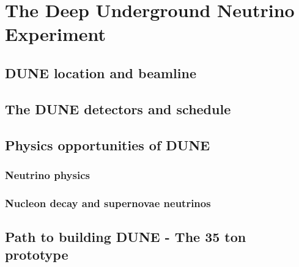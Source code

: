 
\chapter{The Deep Underground Neutrino Experiment}  %

\graphicspath{{DUNE/Figs/PDF/}{DUNE/Figs/Raster/}{DUNE/Figs/Vector}}


\section{DUNE location and beamline} %

\section{The DUNE detectors and schedule} \label{sec:DUNEDetector} %

\section{Physics opportunities of DUNE} %

\subsection{Neutrino physics}  %

\subsection{Nucleon decay and supernovae neutrinos}  %

\section{Path to building DUNE - The 35 ton prototype} \label{sec:The35tonDetector}  %


